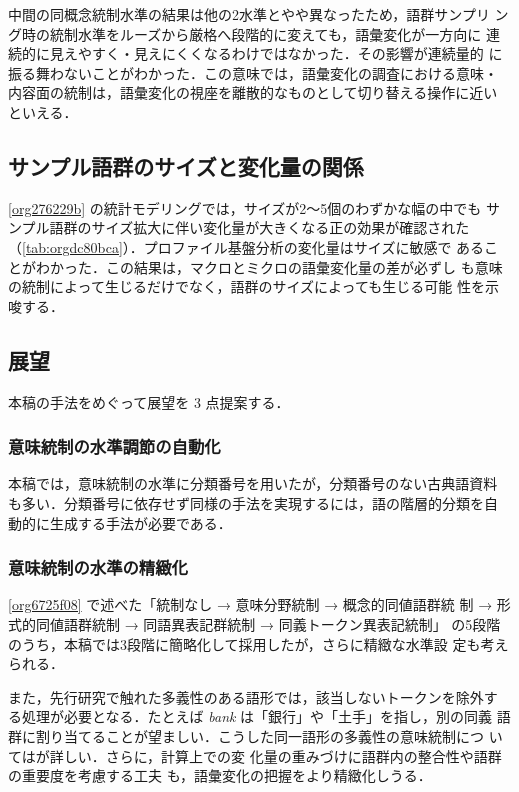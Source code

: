 \documentclass[submit]{ipsj}
\renewcommand{\ref}{\cref}
\begin{document}
中間の同概念統制水準の結果は他の2水準とやや異なったため，語群サンプリ
ング時の統制水準をルーズから厳格へ段階的に変えても，語彙変化が一方向に
連続的に見えやすく・見えにくくなるわけではなかった．その影響が連続量的
に振る舞わないことがわかった．この意味では，語彙変化の調査における意味・
内容面の統制は，語彙変化の視座を離散的なものとして切り替える操作に近い
といえる．
\subsection{サンプル語群のサイズと変化量の関係\label{orgafaaf87}}
\label{sec:org94b3097}
\ref{org276229b} の統計モデリングでは，サイズが2〜5個のわずかな幅の中でも
サンプル語群のサイズ拡大に伴い変化量が大きくなる正の効果が確認された
（\ref{tab:orgdc80bca}）．プロファイル基盤分析の変化量はサイズに敏感で
あることがわかった．この結果は，マクロとミクロの語彙変化量の差が必ずし
も意味の統制によって生じるだけでなく，語群のサイズによっても生じる可能
性を示唆する．
\subsection{展望\label{org45674a1}}
\label{sec:org5174d92}
本稿の手法をめぐって展望を 3 点提案する．
\subsubsection{意味統制の水準調節の自動化\label{org28efdb7}}
\label{sec:org48726a3}
本稿では，意味統制の水準に分類番号を用いたが，分類番号のない古典語資料
も多い．分類番号に依存せず同様の手法を実現するには，語の階層的分類を自
動的に生成する手法が必要である．
\subsubsection{意味統制の水準の精緻化\label{org2e9c5f9}}
\label{sec:orgc9f5700}
\ref{org6725f08} で述べた「統制なし → 意味分野統制 → 概念的同値語群統
制 → 形式的同値語群統制 → 同語異表記群統制 → 同義トークン異表記統制」
の5段階のうち，本稿では3段階に簡略化して採用したが，さらに精緻な水準設
定も考えられる．

また，先行研究で触れた多義性のある語形では，該当しないトークンを除外す
る処理が必要となる．たとえば \emph{bank} は「銀行」や「土手」を指し，別の同義
語群に割り当てることが望ましい．こうした同一語形の多義性の意味統制につ
いては\cite{DePascale2021Scoring}が詳しい．さらに，計算上での変
化量の重みづけに語群内の整合性や語群の重要度を考慮する工夫
\cite{Ruette2014Semantic} も，語彙変化の把握をより精緻化しうる．
\end{document}
